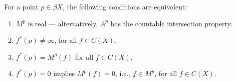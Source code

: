 For a point $p \in \beta X$, the following conditions are equivalent:
\begin{enumerate}
\item[(1)] $M^p$ is real --- alternatively, $A^p$ has the countable intersection property.
\item[(2)] $f^*(p) \neq \infty$, for all $f \in C(X)$.
\item[(3)] $f^*(p) = M^p(f)$ for all $f \in C(X)$.
\item[(4)] $f^*(p) = 0$ implies $M^p(f) = 0$, i.e., $f \in M^p$, for all $f \in C(X)$.
\end{enumerate}
